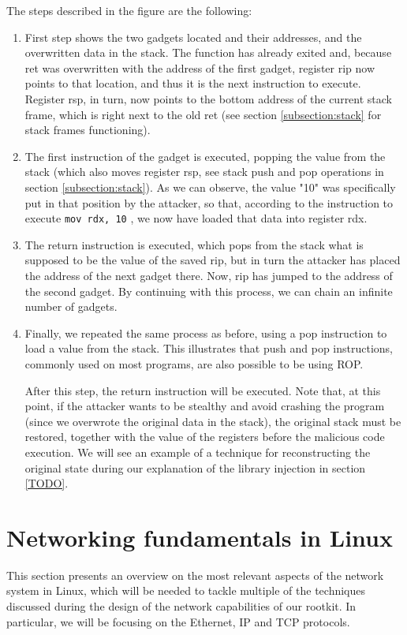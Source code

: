 The steps described in the figure are the following:
\begin{enumerate}
\item First step shows the two gadgets located and their addresses, and the overwritten data in the stack. The function has already exited and, because ret was overwritten with the address of the first gadget, register rip now points to that location, and thus it is the next instruction to execute. Register rsp, in turn, now points to the bottom address of the current stack frame, which is right next to the old ret (see section \ref{subsection:stack} for stack frames functioning).
\item The first instruction of the gadget is executed, popping the value from the stack (which also moves register rsp, see stack push and pop operations in section \ref{subsection:stack}). As we can observe, the value "10" was specifically put in that position by the attacker, so that, according to the instruction to execute \lstinline{mov rdx, 10} \lstinline{}, we now have loaded that data into register rdx.
\item The return instruction is executed, which pops from the stack what is supposed to be the value of the saved rip, but in turn the attacker has placed the address of the next gadget there. Now, rip has jumped to the address of the second gadget. By continuing with this process, we can chain an infinite number of gadgets.
\item Finally, we repeated the same process as before, using a pop instruction to load a value from the stack. This illustrates that push and pop instructions, commonly used on most programs, are also possible to be using ROP.

After this step, the return instruction will be executed. Note that, at this point, if the attacker wants to be stealthy and avoid crashing the program (since we overwrote the original data in the stack), the original stack must be restored, together with the value of the registers before the malicious code execution. We will see an example of a technique for reconstructing the original state during our explanation of the library injection in section \ref{TODO}.
\end{enumerate}



\section{Networking fundamentals in Linux} \label{section:networking_fundamentals}
This section presents an overview on the most relevant aspects of the network system in Linux, which will be needed to tackle multiple of the techniques discussed during the design of the network capabilities of our rootkit. In particular, we will be focusing on the Ethernet, IP and TCP protocols.

